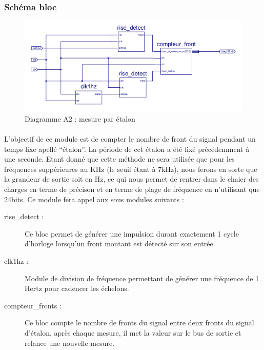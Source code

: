 \documentclass[a4paper,11pt]{article}
\begin{document}
  \subsubsection{Schéma bloc}
  
  \begin{figure}[H]
\begin{center}
	\includegraphics[scale=1]{sch-etalon.png}
	\caption{Diagramme A2 : mesure par étalon}
\end{center}
\end{figure}

\paragraph{} L'objectif de ce module est de compter le nombre de front du signal pendant un temps fixe apellé ``étalon''.
La période de cet étalon a été fixé précédemment à une seconde. Etant donné que cette méthode ne sera utilisée que pour les 
fréquences suppérieures au KHz (le seuil étant à 7kHz), nous ferons en sorte que la grandeur de sortie soit en Hz, ce qui nous permet 
de rentrer dans le chaier des charges en terme de précison et en terme de plage de fréquence en n'utilisant que 24bits. Ce module 
fera appel aux sous modules suivants :

\begin{description}
  \item[rise\_detect : ] Ce bloc permet de générer une impulsion durant exactement 1 cycle d'horloge lorsqu'un front montant est détecté
  sur son entrée.
  \item[clk1hz : ] Module de division de fréquence permettant de générer une fréquence de 1 Hertz pour cadencer les échelons.
  \item[compteur\_fronts : ] Ce bloc compte le nombre de fronts du signal entre deux fronts du signal d'étalon, après chaque mesure,
  il met la valeur sur le bus de sortie et relance une nouvelle mesure.
\end{description}
\end{document}
